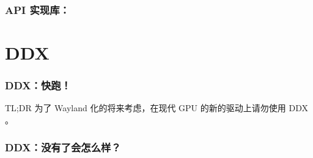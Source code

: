 \documentclass{ctexbeamer}
\begin{document}
\begin{frame}
    \frametitle{API 实现库：}
\end{frame}

\section{DDX}

\begin{frame}
    \frametitle{DDX：快跑！}
    \begin{alertblock}{TL;DR}
        为了 Wayland 化的将来考虑，在现代 GPU 的新的驱动上请勿使用 DDX 。
    \end{alertblock}
\end{frame}

\begin{frame}
    \frametitle{DDX：没有了会怎么样？}
\end{frame}
\end{document}
